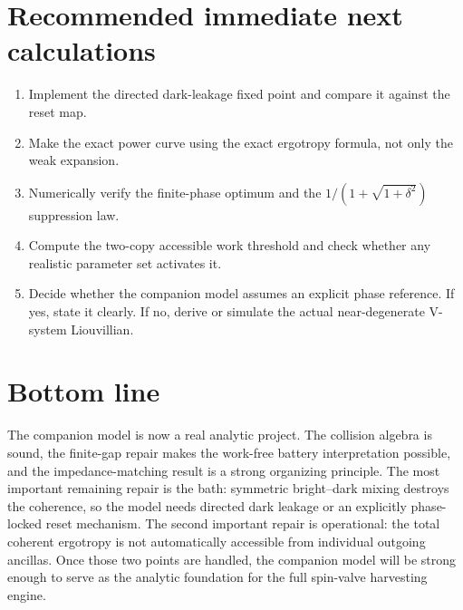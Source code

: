 \documentclass[11pt,a4paper]{article}
\begin{document}
\section{Recommended immediate next calculations}

\begin{enumerate}
\item Implement the directed dark-leakage fixed point and compare it against the reset map.
\item Make the exact power curve using the exact ergotropy formula, not only the weak expansion.
\item Numerically verify the finite-phase optimum and the $1/(1+\sqrt{1+\delta^2})$ suppression law.
\item Compute the two-copy accessible work threshold and check whether any realistic parameter set activates it.
\item Decide whether the companion model assumes an explicit phase reference. If yes, state it clearly. If no, derive or simulate the actual near-degenerate V-system Liouvillian.
\end{enumerate}

\section{Bottom line}

The companion model is now a real analytic project. The collision algebra is sound, the finite-gap repair makes the work-free battery interpretation possible, and the impedance-matching result is a strong organizing principle. The most important remaining repair is the bath: symmetric bright--dark mixing destroys the coherence, so the model needs directed dark leakage or an explicitly phase-locked reset mechanism. The second important repair is operational: the total coherent ergotropy is not automatically accessible from individual outgoing ancillas. Once those two points are handled, the companion model will be strong enough to serve as the analytic foundation for the full spin-valve harvesting engine.
\end{document}
